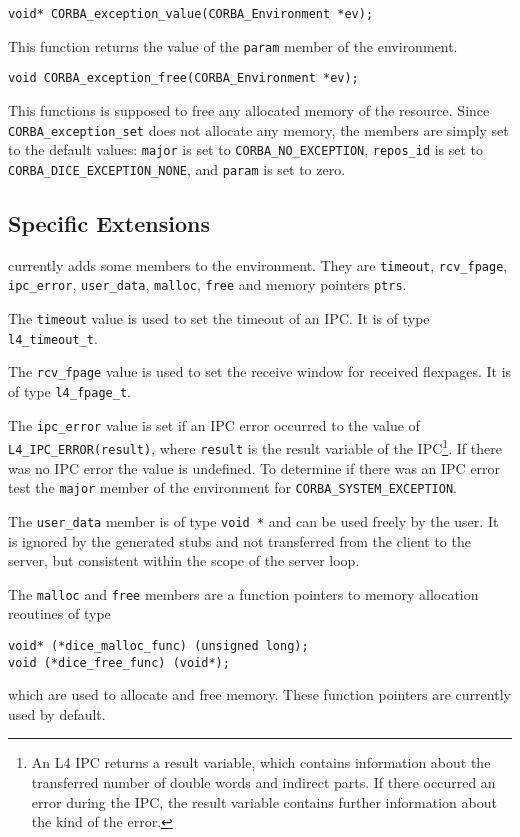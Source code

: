 \begin{verbatim}
void* CORBA_exception_value(CORBA_Environment *ev);
\end{verbatim}

This function returns the value of the \verb|param| member of
the environment.

\begin{verbatim}
void CORBA_exception_free(CORBA_Environment *ev);
\end{verbatim}

This functions is supposed to free any allocated memory of
the resource. Since \verb|CORBA_exception_set| does not
allocate any memory, the members are simply set to the default
values: \verb|major| is set to \verb|CORBA_NO_EXCEPTION|,
\verb|repos_id| is set to \verb|CORBA_DICE_EXCEPTION_NONE|,
and \verb|param| is set to zero.

\subsection{\dice{} Specific Extensions}
\label{sec:env-dice}

\dice{} currently adds some members to the environment.
They are \verb|timeout|, \verb|rcv_fpage|, \verb|ipc_error|,
\verb|user_data|, \verb|malloc|, \verb|free| and memory
pointers \verb|ptrs|.

The \verb|timeout| value is used to set the timeout
of an IPC. It is of type \verb|l4_timeout_t|.

The \verb|rcv_fpage| value is used to set the receive
window for received flexpages. It is of type
\verb|l4_fpage_t|.

The \verb|ipc_error| value is set if an IPC error
occurred to the value of \verb|L4_IPC_ERROR(result)|,
where \verb|result| is the result variable of the
IPC\footnote{An L4 IPC returns a result variable,
which contains information about the transferred number
of double words and indirect parts. If there occurred an
error during the IPC, the result variable contains
further information about the kind of the error.}.
If there was no IPC error the value is undefined.
To determine if there was an IPC error test the
\verb|major| member of the environment for
\verb|CORBA_SYSTEM_EXCEPTION|.

The \verb|user_data| member is of type \verb|void *| and
can be used freely by the user. It is ignored by the generated
stubs and not transferred from the client to the server,
but consistent within the scope of the server loop.

The \verb|malloc| and \verb|free| members are a function pointers
to memory allocation reoutines of type
\begin{verbatim}
void* (*dice_malloc_func) (unsigned long);
void (*dice_free_func) (void*);
\end{verbatim}
which are used to allocate and free memory. These function pointers
are currently used by default.

